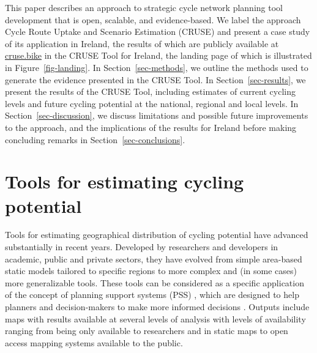 \documentclass[
  super,
  preprint,
  3p]{elsarticle}
\begin{document}
This paper describes an approach to strategic cycle network planning
tool development that is open, scalable, and evidence-based. We label
the approach Cycle Route Uptake and Scenario Estimation (CRUSE) and
present a case study of its application in Ireland, the results of which
are publicly available at \href{https://cruse.bike/}{cruse.bike} in the
CRUSE Tool for Ireland, the landing page of which is illustrated in
Figure~\ref{fig-landing}. In Section~\ref{sec-methods}, we outline the
methods used to generate the evidence presented in the CRUSE Tool. In
Section~\ref{sec-results}, we present the results of the CRUSE Tool,
including estimates of current cycling levels and future cycling
potential at the national, regional and local levels. In
Section~\ref{sec-discussion}, we discuss limitations and possible future
improvements to the approach, and the implications of the results for
Ireland before making concluding remarks in
Section~\ref{sec-conclusions}.

\section{Tools for estimating cycling
potential}\label{tools-for-estimating-cycling-potential}

Tools for estimating geographical distribution of cycling potential have
advanced substantially in recent years. Developed by researchers and
developers in academic, public and private sectors, they have evolved
from simple area-based static models tailored to specific regions to
more complex and (in some cases) more generalizable tools. These tools
can be considered as a specific application of the concept of planning
support systems (PSS) , which are designed to help planners and
decision-makers to make more informed decisions \citep{geertman2009}.
Outputs include maps with results available at several levels of
analysis with levels of availability ranging from being only available
to researchers and in static maps to open access mapping systems
available to the public.
\end{document}
